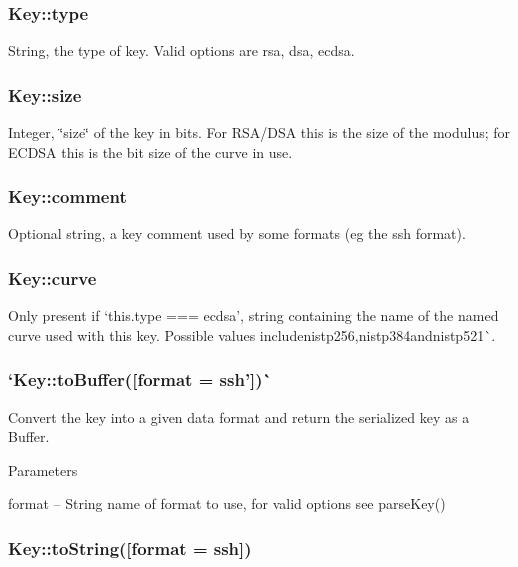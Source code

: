 \subsubsection*{{\ttfamily Key\+::type}}

String, the type of key. Valid options are {\ttfamily rsa}, {\ttfamily dsa}, {\ttfamily ecdsa}.

\subsubsection*{{\ttfamily Key\+::size}}

Integer, \char`\"{}size\char`\"{} of the key in bits. For R\+S\+A/\+D\+SA this is the size of the modulus; for E\+C\+D\+SA this is the bit size of the curve in use.

\subsubsection*{{\ttfamily Key\+::comment}}

Optional string, a key comment used by some formats (eg the {\ttfamily ssh} format).

\subsubsection*{{\ttfamily Key\+::curve}}

Only present if `this.\+type === \textquotesingle{}ecdsa'{\ttfamily , string containing the name of the named curve used with this key. Possible values include}nistp256{\ttfamily ,}nistp384{\ttfamily  and}nistp521\`{}.

\subsubsection*{`Key\+::to\+Buffer(\mbox{[}format = \textquotesingle{}ssh'\mbox{]})\`{}}

Convert the key into a given data format and return the serialized key as a Buffer.

Parameters


\begin{DoxyItemize}
\item {\ttfamily format} -- String name of format to use, for valid options see {\ttfamily parse\+Key()}
\end{DoxyItemize}

\subsubsection*{{\ttfamily Key\+::to\+String(\mbox{[}format = \textquotesingle{}ssh\mbox{]})}}

